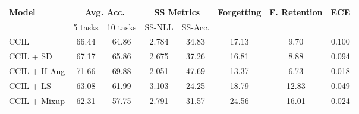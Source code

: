 \documentclass[final]{cvpr}
\newcommand{\ilkd}{CCIL }
\newcommand{\cfr}{} \newcommand\todo[1]{(\textcolor{red}{TODO: #1})}
\begin{document}
\begin{table*}[t]
    \begin{center}
\begin{tabular}{| @{\hskip10pt}l@{\hskip10pt}|@{\hskip10pt}c@{\hskip10pt}|@{\hskip10pt}c@{\hskip10pt}|c|c |c|c | c|}
   
    \hline
    
    \multirow{2}{*}{\textbf{Model}} &  \multicolumn{2}{c|}{\textbf{ Avg. Acc.}} & \multicolumn{2}{c|}{\textbf{SS Metrics}}  &  \textbf{Forgetting} & \textbf{F. Retention} & \multirow{2}{*}{\textbf{ECE}} \\
    
& 5 tasks  & 10 tasks  & SS-NLL  & SS-Acc.   &    & \cfr  & \\
  \hline
    \ilkd                            & 66.44    & 64.86  & 2.784    & 34.83  & 17.13 & 9.70 & 0.100\\
    \ilkd + SD                       & \textcolor{dgreen}{67.17}             & \textcolor{dgreen}{65.86}     & \textcolor{dgreen}{2.675}     & \textcolor{dgreen}{37.26}  & \textcolor{dgreen}{16.81} &  \textcolor{dgreen}{8.88} & \textcolor{dgreen}{0.094}\\
    
    \ilkd +  H-Aug                   & \textcolor{dgreen}{71.66}             & \textcolor{dgreen}{69.88}     & \textcolor{dgreen}{2.051}     & \textcolor{dgreen}{47.69} & \textcolor{dgreen}{13.37} & \textcolor{dgreen}{6.73} & \textcolor{dgreen}{0.018}\\
    
    \ilkd + LS                       & \textcolor{dred}{63.08}               & \textcolor{dred}{61.99}       & \textcolor{dred}{3.103}       & \textcolor{dred}{24.25} & \textcolor{dred}{18.79} & \textcolor{dred}{12.83} & \textcolor{dgreen}{0.049}  \\
    
    \ilkd + Mixup                    & \textcolor{dred}{62.31}               & \textcolor{dred}{57.75}       & \textcolor{dred}{2.791}       & \textcolor{dred}{31.57} &  \textcolor{dred}{24.56} &  \textcolor{dred}{16.01} & \textcolor{dgreen}{0.024} \\


    \hline
    \end{tabular}
    \end{center}
    \caption{Effect of regularization class-IL average accuracy, secondary information (on the first-task model), forgetting rate and feature retention (5 tasks), on CIFAR-100. All the values are averaged over 3 runs.  and  in the column headings indicate that lower and higher values are better respectively.
Values that are better than the \ilkd baseline are marked in green whereas the worse ones are marked in red. SD:self-distillation, LS:label-smoothing, H-Aug:heavy data augmentation. Standard deviation in Appendix A.}
    \label{table:reg}
\end{table*}
\end{document}

